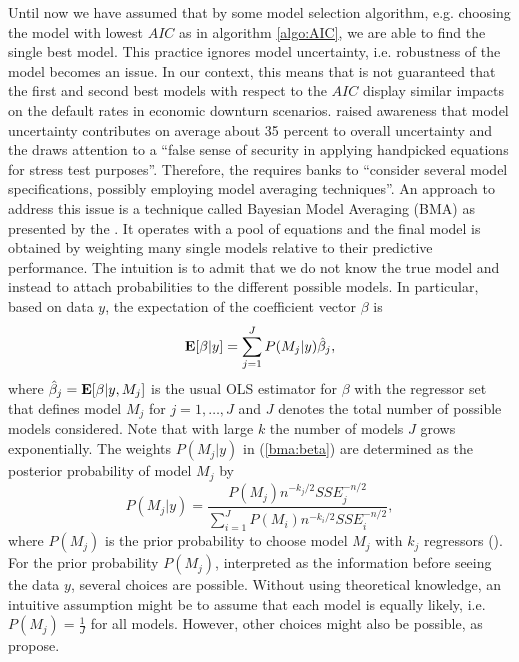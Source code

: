 \documentclass[a4paper, 11pt]{scrreprt}
\newcommand{\ew}{\mbox{\textbf{E}}}
\begin{document}
Until now we have assumed that by some model selection algorithm, e.g. choosing the model with lowest $AIC$ as in algorithm \ref{algo:AIC}, we are able to find the single best model. This practice ignores model uncertainty, i.e. robustness of the model becomes an issue. In our context, this means that is not guaranteed that the first and second best models with respect to the $AIC$ display similar impacts on the default rates in economic downturn scenarios. 
 \textcite{gross2017implications} raised awareness that model uncertainty contributes on average about 35 percent to overall uncertainty and the \textcite{ecb2015handpicked} draws attention to a ``false sense of security in applying handpicked equations for stress test purposes''.
 Therefore, the \textcite[chapter 
 2.3.1.5.v]{ecb2018srep} requires banks to ``consider several model specifications, possibly employing model averaging techniques''. An approach to address this issue is a technique called Bayesian Model Averaging (BMA) as presented by the \textcite[chapter 4.1]{ecb2017stampe}. 
It operates with a pool of equations and the final model is obtained by weighting many single models relative to their predictive performance.
The intuition is to admit that we do not know the true model and instead to attach probabilities to the different possible models.
In particular, based on data $y$, the expectation of the coefficient vector $\beta$ is 
\begin{equation}\label{bma:beta}
\ew[\beta | y] = \sum_{j=1}^{J} P(M_j | y) \hat{\beta}_j,
\end{equation}
where $\hat{\beta}_j = \ew[\beta | y, M_j]$ is the usual OLS estimator for $\beta$ with the regressor set that defines model $M_j$ for $j=1,\ldots,J$ and $J$ denotes the total number of possible models considered. Note that with large $k$ the number of models $J$ grows exponentially.
The weights $P(M_j | y)$ in (\ref{bma:beta}) are determined as the posterior probability of model $M_j$ by
\begin{equation}
P(M_j | y) = \frac{P(M_j) n^{-k_j/2} SSE_j^{-n/2}}{\sum_{i=1}^{J} P(M_i) n^{-k_i/2} SSE_i^{-n/2}},
\end{equation}
where $P(M_j)$ is the prior probability to choose model $M_j$ with $k_j$ regressors
(\textcite[chapter I.B]{doppelhofer2004determinants}).
For the prior probability $P(M_j)$, interpreted as the information before seeing the data $y$, several choices are possible. Without using theoretical knowledge, an intuitive assumption might be to assume that each model is equally likely, i.e. 
$P(M_j) = \frac{1}{J}$ for all models. However, other choices might also be possible, as \textcite[chapter 3]{figini2013credit} propose.
\end{document}
